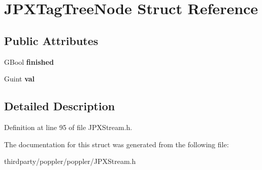 \hypertarget{struct_j_p_x_tag_tree_node}{}\section{J\+P\+X\+Tag\+Tree\+Node Struct Reference}
\label{struct_j_p_x_tag_tree_node}
\subsection*{Public Attributes}
\begin{DoxyCompactItemize}
\item 
\mbox{\label{struct_j_p_x_tag_tree_node_ad77fbc607a288a9ea01249f8532c0fba}} 
G\+Bool {\bfseries finished}
\item 
\mbox{\label{struct_j_p_x_tag_tree_node_a4c14a43510320316edc312204593b8b5}} 
Guint {\bfseries val}
\end{DoxyCompactItemize}


\subsection{Detailed Description}


Definition at line 95 of file J\+P\+X\+Stream.\+h.



The documentation for this struct was generated from the following file\+:\begin{DoxyCompactItemize}
\item 
thirdparty/poppler/poppler/J\+P\+X\+Stream.\+h\end{DoxyCompactItemize}
